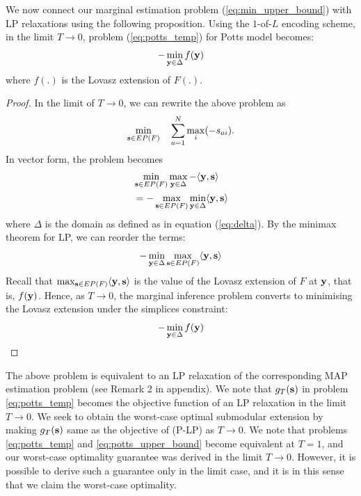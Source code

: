 We now connect our marginal estimation problem (\ref{eq:min_upper_bound}) with
LP relaxations using the following proposition.
{\proposition Using the $1$-of-$L$ encoding scheme, in the limit $T \to 0$,
  problem (\ref{eq:potts_temp}) for Potts model becomes:
\begin{align}
    - \min_{{\bf y} \in \Delta} f({\bf y}) 
\end{align}
where $f(.)$ is the Lovasz extension of $F(.)$.
\label{proposition:potts_equiv}}

\begin{proof}
In the limit of $T \to 0$, we can rewrite the above problem as
\begin{equation}
    \min_{{\bf s} \in EP(F)} \quad \sum_{a = 1}^{N} \max_{i} (-s_{ai}).
\end{equation}
In vector form, the problem becomes
\begin{align}
    &\min_{{\bf s} \in EP(F)} \max_{{\bf y} \in \Delta} - \langle {\bf y}, {\bf s} \rangle \\
    & = - \max_{{\bf s} \in EP(F)} \min_{{\bf y} \in \Delta} \langle {\bf y}, {\bf s} \rangle
    \label{eq:maxmin}
\end{align}
where $\Delta$ is the domain as defined as in equation (\ref{eq:delta}). By the minimax theorem for LP, we can reorder the terms:
\begin{equation}
    - \min_{{\bf y} \in \Delta} \max_{{\bf s} \in EP(F)} \langle {\bf y}, {\bf s} \rangle 
    \label{eq:minmax}
\end{equation}
Recall that $\max_{{\bf s} \in EP(F)} \langle {\bf y}, {\bf s} \rangle$ is the value of the Lovasz extension of $F$ at $\bf y$, that is, $f({\bf y})$. Hence, as $T \to 0$, the marginal inference problem converts to minimising the Lovasz extension under the simplices constraint:
\begin{equation}
    - \min_{{\bf y} \in \Delta} f({\bf y}) 
    \label{eq:minLovasz}
\end{equation}
\end{proof}

The above problem is equivalent to an LP relaxation of the corresponding MAP
estimation problem (see Remark 2 in appendix). We note that $g_T ({\bf s})$ in
problem \eqref{eq:potts_temp} becomes the objective function of an LP
relaxation in the limit $T \to 0$. We seek to obtain the worst-case optimal
submodular extension by making $g_T ({\bf s})$ same as the objective of (P-LP)
as $T \to 0$. We note that problems \eqref{eq:potts_temp} and
\eqref{eq:potts_upper_bound} become equivalent at $T = 1$, and our worst-case optimality
guarantee was derived in the limit $T \to 0$. However, it is possible to
derive such a guarantee only in the limit case, and it is in this sense that we
claim the worst-case optimality.

